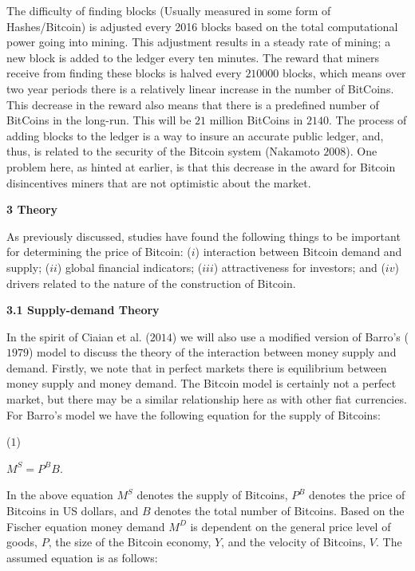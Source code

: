 \documentclass{article}[10 pt]
\newcommand{\vs}{\vspace{0.1in}}
\begin{document}
\vs

The difficulty of finding blocks (Usually measured in some form of
Hashes/Bitcoin) is adjusted every 2016 blocks based on the
total computational power going into mining. This adjustment results in a
steady rate of mining; a new block is added to the ledger every ten minutes.
The reward that miners receive from finding these blocks is halved every
$210000$ blocks, which means over two year periods there is a relatively linear
increase in the number of BitCoins. This decrease in the reward also means
that there is a predefined number of BitCoins in the long-run. This will be
$21$ million BitCoins in $2140$. The process of adding blocks to the ledger
is a way to insure an accurate public ledger, and, thus, is related to the
security of the Bitcoin system (Nakamoto $2008$). One problem here, as
hinted at earlier, is that this decrease in the award for Bitcoin
disincentives miners that are not optimistic about the market.

\vs


\vs

\textbf{3 Theory}

\vs

As previously discussed, studies have found the following things to be
important for determining the price of Bitcoin: ($i$) interaction between
Bitcoin demand and supply; ($ii$) global financial indicators; ($iii$)
attractiveness for investors; and ($iv$) drivers related to the nature of
the construction of Bitcoin.

\vs

\textbf{3.1 Supply-demand Theory}

\vs

In the spirit of Ciaian et al. ($2014$) we will also use a modified version
of Barro’s ($1979$) model to discuss the theory of the interaction between
money supply and demand. Firstly, we note that in perfect markets there is
equilibrium between money supply and money demand. The Bitcoin model is
certainly not a perfect market, but there may be a similar relationship here
as with other fiat currencies. For Barro’s model we have the following
equation for the supply of Bitcoins:

\vs

($1$) \begin{center} $M^{S} = P^{B}B$. \end{center}

\vs

In the above equation $M^{S}$ denotes the supply of Bitcoins, $P^{B}$
denotes the price of Bitcoins in US dollars, and $B$ denotes the total
number of Bitcoins. Based on the Fischer equation money demand $M^{D}$ is
dependent on the general price level of goods, $P$, the size of the Bitcoin
economy, $Y$, and the velocity of Bitcoins, $V$. The assumed equation is as
follows:
\end{document}
